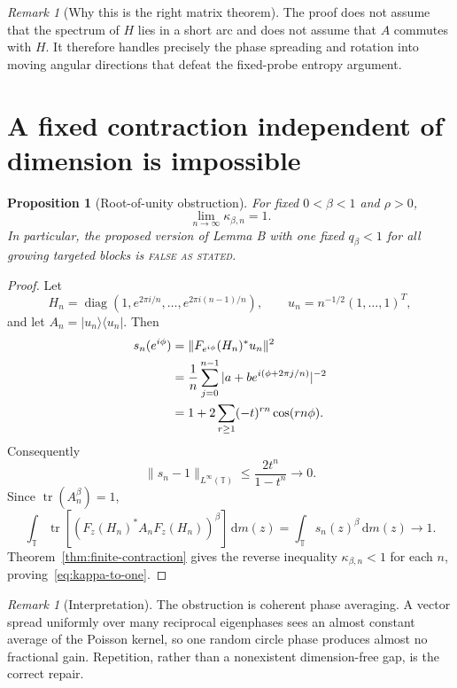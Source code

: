 \documentclass[11pt]{article}
\newtheorem{proposition}[theorem]{Proposition}
\theoremstyle{remark}
\newtheorem{remark}[theorem]{Remark}
\newcommand{\T}{\mathbb T}
\newcommand{\dd}{\,\mathrm d}
\newcommand{\tr}{\operatorname{tr}}
\newcommand{\falseclaim}{\textcolor{false}{\textnormal{\textsc{false as stated}}}}
\begin{document}
\begin{remark}[Why this is the right matrix theorem]
The proof does not assume that the spectrum of $H$ lies in a short arc and
does not assume that $A$ commutes with $H$.  It therefore handles precisely
the phase spreading and rotation into moving angular directions that defeat
the fixed-probe entropy argument.
\end{remark}

\section{A fixed contraction independent of dimension is impossible}

\begin{proposition}[Root-of-unity obstruction]
\label{prop:no-dim-free}
For fixed $0<\beta<1$ and $\rho>0$,
\begin{equation}
 \lim_{n\to\infty}\kappa_{\beta,n}=1.
 \label{eq:kappa-to-one}
\end{equation}
In particular, the proposed version of Lemma B with one fixed
$q_\beta<1$ for all growing targeted blocks is \falseclaim.
\end{proposition}

\begin{proof}
Let
\[
 H_n=\operatorname{diag}(1,e^{2\pi i/n},\ldots,e^{2\pi i(n-1)/n}),
 \qquad
 u_n=n^{-1/2}(1,\ldots,1)^T,
\]
and let $A_n=|u_n\rangle\langle u_n|$.  Then
\begin{align}
 s_n(e^{i\phi})
 &=\|F_{e^{i\phi}}(H_n)^*u_n\|^2\notag\\
 &=\frac1n\sum_{j=0}^{n-1}
 |a+be^{i(\phi+2\pi j/n)}|^{-2}\notag\\
 &=1+2\sum_{r\geq1}(-t)^{rn}\cos(rn\phi).
 \label{eq:root-average}
\end{align}
Consequently
\begin{equation}
 \|s_n-1\|_{L^\infty(\T)}
 \leq \frac{2t^n}{1-t^n}\longrightarrow0.
 \label{eq:root-uniform}
\end{equation}
Since $\tr(A_n^\beta)=1$,
\[
 \int_\T\tr[(F_z(H_n)^*A_nF_z(H_n))^\beta]\dd m(z)
 =\int_\T s_n(z)^\beta\dd m(z)\longrightarrow1.
\]
Theorem~\ref{thm:finite-contraction} gives the reverse inequality
$\kappa_{\beta,n}<1$ for each $n$, proving~\eqref{eq:kappa-to-one}.
\end{proof}

\begin{remark}[Interpretation]
The obstruction is coherent phase averaging.  A vector spread uniformly
over many reciprocal eigenphases sees an almost constant average of the
Poisson kernel, so one random circle phase produces almost no fractional
gain.  Repetition, rather than a nonexistent dimension-free gap, is the
correct repair.
\end{remark}
\end{document}
